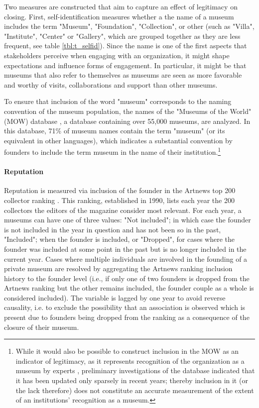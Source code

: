 \documentclass[12pt]{article}
\begin{document}
Two measures are constructed that aim to capture an effect of legitimacy on closing.
First, self-identification measures whether a the name of a museum includes the term "Museum", "Foundation", "Collection", or other (such as "Villa", "Institute", "Center" or "Gallery", which are grouped together as they are less frequent, see table \ref{tbl:t_selfid}).
Since the name is one of the first aspects that stakeholders perceive when engaging with an organization, it might shape expectations and influence forms of engagement.
In particular, it might be that museums that also refer to themselves as museums are seen as more favorable and worthy of visits, collaborations and support than other museums.


To ensure that inclusion of the word "museum" corresponds to the naming convention of the museum population, the names of the "Museums of the World" (MOW) database \parencite{deGruyter_2021_MOW}, a database containing over 55,000 museums, are analyzed.
In this database, 71\% of museum names contain the term "museum" (or its equivalent in other languages), which indicates a substantial convention by founders to include the term museum in the name of their institution.\footnote{While it would also be possible to construct inclusion in the MOW as an indicator of legitimacy, as it represents recognition of the organization as a museum by experts \parencite{Zuckerman_1999_illegitimacy}, preliminary investigations of the database indicated that it has been  updated only sparsely in recent years; thereby inclusion in it (or the lack therefore) does not constitute an accurate measurement of the extent of an institutions' recognition as a museum.}
\paragraph*{Reputation}


Reputation is measured via inclusion of the founder in the Artnews top 200 collector ranking \parencite{Artnews_ranking}.
This ranking, established in 1990, lists each year the 200 collectors the editors of the magazine consider most relevant.
For each year, a museums can have one of three values: "Not included"; in which case the founder is not included in the year in question and has not been so in the past, "Included"; when the founder is included, or "Dropped", for cases where the founder was included at some point in the past but is no longer included in the current year.
Cases where multiple individuals are involved in the founding of a private museum are resolved by aggregating the Artnews ranking inclusion history to the founder level (i.e., if only one of two founders is dropped from the Artnews ranking but the other remains included, the founder couple as a whole is considered included).
The variable is lagged by one year to avoid reverse causality, i.e. to exclude the possibility that an association is observed which is present due to founders being dropped from the ranking as a consequence of the closure of their museum.
\end{document}

